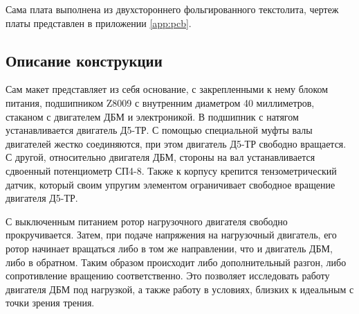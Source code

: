 Сама плата выполнена из двухстороннего фольгированного текстолита, чертеж платы представлен
в приложении \ref{app:pcb}.

\subsection{Описание конструкции}

Сам макет представляет из себя основание, с закрепленными к нему блоком питания, подшипником Z8009 
с внутренним диаметром 40 миллиметров, стаканом с двигателем ДБМ и электроникой. 
В подшипник с натягом устанавливается двигатель Д5-ТР. С помощью специальной муфты валы двигателей
жестко соединяются, при этом двигатель Д5-ТР свободно вращается. С другой, относительно двигателя ДБМ,
стороны на вал устанавливается сдвоенный потенциометр СП4-8. Также к корпусу крепится тензометрический
датчик, который своим упругим элементом ограничивает свободное вращение двигателя Д5-ТР.

С выключенным питанием ротор нагрузочного двигателя свободно прокручивается. Затем, при подаче
напряжения на нагрузочный двигатель, его ротор начинает вращаться либо в том же направлении, что и 
двигатель ДБМ, либо в обратном. Таким образом происходит либо дополнительный разгон, либо 
сопротивление вращению соответственно. Это позволяет исследовать работу двигателя ДБМ под нагрузкой,
а также работу в условиях, близких к идеальным с точки зрения трения.

